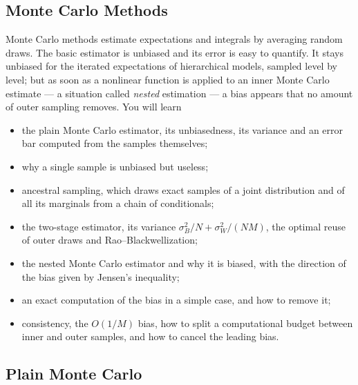 \begin{notechapter}
\chapter{Monte Carlo Methods}\label{ch:monte-carlo}

\begin{chapterintro}
Monte Carlo methods estimate expectations and integrals by averaging random
draws. The basic estimator is unbiased and its error is easy to quantify. It stays
unbiased for the iterated expectations of hierarchical models, sampled level by
level; but as soon as a nonlinear function is applied to an inner Monte Carlo
estimate --- a situation called \emph{nested} estimation --- a bias appears that no
amount of outer sampling removes. You will learn
\begin{itemize}[nosep]
  \item the plain Monte Carlo estimator, its unbiasedness, its variance and an
        error bar computed from the samples themselves;
  \item why a single sample is unbiased but useless;
  \item ancestral sampling, which draws exact samples of a joint distribution and
        of all its marginals from a chain of conditionals;
  \item the two-stage estimator, its variance $\sigma_B^2/N + \sigma_W^2/(NM)$, the optimal
        reuse of outer draws and Rao--Blackwellization;
  \item the nested Monte Carlo estimator and why it is biased, with the
        direction of the bias given by Jensen's inequality;
  \item an exact computation of the bias in a simple case, and how to remove it;
  \item consistency, the $O(1/M)$ bias, how to split a computational budget
        between inner and outer samples, and how to cancel the leading bias.
\end{itemize}
\end{chapterintro}

\section{Plain Monte Carlo}\label{monte-carlo:sec:plain}


\end{notechapter}
